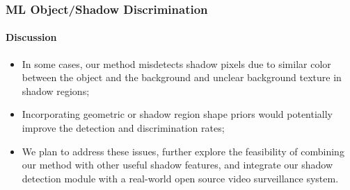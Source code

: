 
\begin{frame}
    \frametitle{ML Object/Shadow Discrimination}
    \framesubtitle{Discussion}

    \begin{itemize}
        \item In some cases, our method misdetects shadow pixels due to 
            similar color between the object and the background and unclear 
            background texture in shadow regions;
        \item Incorporating geometric or shadow region shape priors would 
            potentially improve the detection and discrimination rates;
        \item We plan to address these issues, further explore the feasibility 
            of combining our method with other useful shadow features, and 
            integrate our shadow detection module with a real-world open source 
            video surveillance system.
    \end{itemize}

\end{frame}

